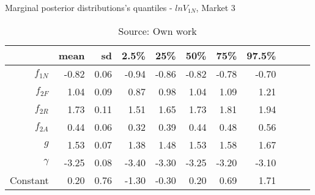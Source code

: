 \begin{table}[H]
\caption{Marginal posterior distributions's quantiles - $ln V_{1N}$,  Market 3}
\centering
\begin{tabular}{rrrrrrrrrrr}
  \toprule
          & mean   & sd   & 2.5\% & 25\%  & 50\%  & 75\%  & 97.5\% \\ 
  \hline
  $f_{1N}$ & -0.82  & 0.06 & -0.94 & -0.86 & -0.82 & -0.78 & -0.70 \\ 
  $f_{2F}$ & 1.04   & 0.09 & 0.87  & 0.98  & 1.04  & 1.09  & 1.21  \\ 
  $f_{2R}$ & 1.73   & 0.11 & 1.51  & 1.65  & 1.73  & 1.81  & 1.94  \\ 
  $f_{2A}$ & 0.44   & 0.06 & 0.32  & 0.39  & 0.44  & 0.48  & 0.56  \\ 
  $g$      & 1.53   & 0.07 & 1.38  & 1.48  & 1.53  & 1.58  & 1.67  \\ 
  $\gamma$ & -3.25  & 0.08 & -3.40 & -3.30 & -3.25 & -3.20 & -3.10 \\ 
  Constant & 0.20   & 0.76 & -1.30 & -0.30 & 0.20  & 0.69  & 1.71  \\ 
     \bottomrule
\end{tabular}
\caption*{Source: Own work}
\end{table}
